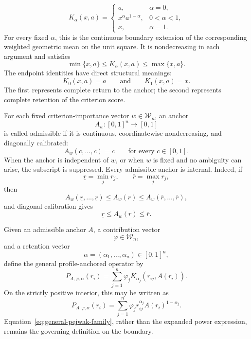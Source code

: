 \documentclass[reqno,11pt]{amsart}
\theoremstyle{definition}
\theoremstyle{plain}
\theoremstyle{remark}
\begin{document}
\begin{equation}
K_{\alpha}(x,a)=
\begin{cases}
a, & \alpha=0,\\[1mm]
x^{\alpha}a^{1-\alpha}, & 0<\alpha<1,\\[1mm]
x, & \alpha=1.
\end{cases}
\label{eq:anchoring-kernel}
\end{equation}
For every fixed $\alpha$, this is the continuous boundary extension of the corresponding weighted geometric mean on the unit square. It is nondecreasing in each argument and satisfies
\begin{equation*}
\min\{x,a\}
\leq
K_{\alpha}(x,a)
\leq
\max\{x,a\}.
\end{equation*}
The endpoint identities have direct structural meanings:
\[
K_0(x,a)=a
\qquad\text{and}\qquad
K_1(x,a)=x.
\]
The first represents complete return to the anchor; the second represents complete retention of the criterion score.

For each fixed criterion-importance vector $w\in\mathcal W_n$, an anchor
\[
A_w:[0,1]^n\longrightarrow[0,1]
\]
is called admissible if it is continuous, coordinatewise nondecreasing, and diagonally calibrated:
\begin{equation*}
A_w(c,\ldots,c)=c
\qquad
\text{for every }c\in[0,1].
\end{equation*}
When the anchor is independent of $w$, or when $w$ is fixed and no ambiguity can arise, the subscript is suppressed. Every admissible anchor is internal. Indeed, if
\[
\underline r=\min_jr_j,
\qquad
\overline r=\max_jr_j,
\]
then
\[
A_w(\underline r,\ldots,\underline r)
\leq
A_w(r)
\leq
A_w(\overline r,\ldots,\overline r),
\]
and diagonal calibration gives
\begin{equation*}
\underline r
\leq
A_w(r)
\leq
\overline r.
\end{equation*}

Given an admissible anchor $A$, a contribution vector
\[
\varphi\in\mathcal W_n,
\]
and a retention vector
\[
\alpha=(\alpha_1,\ldots,\alpha_n)\in[0,1]^n,
\]
define the general profile-anchored operator by
\begin{equation}
P_{A,\varphi,\alpha}(r_i)
=
\sum_{j=1}^{n}
\varphi_j
K_{\alpha_j}
\left(
r_{ij},A(r_i)
\right).
\label{eq:general-pejwak-family}
\end{equation}
On the strictly positive interior, this may be written as
\begin{equation*}
P_{A,\varphi,\alpha}(r_i)
=
\sum_{j=1}^{n}
\varphi_j
r_{ij}^{\alpha_j}
A(r_i)^{1-\alpha_j}.
\end{equation*}
Equation~\eqref{eq:general-pejwak-family}, rather than the expanded power expression, remains the governing definition on the boundary.
\end{document}
